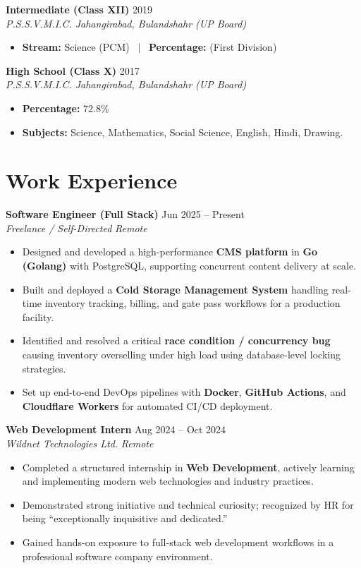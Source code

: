 \documentclass[a4paper,10pt]{article}
\newcommand{\entry}[4]{
  \noindent\textbf{#1} \hfill #2 \\
  \textit{#3} \hfill \textit{#4}
}
\begin{document}
\vspace{5pt}

\entry{Intermediate (Class XII)}{2019}
{P.S.S.V.M.I.C. Jahangirabad, Bulandshahr (UP Board)}{}
\begin{itemize}[noitemsep,topsep=0pt,leftmargin=15pt]
    \item \textbf{Stream:} Science (PCM) \ $|$ \ \textbf{Percentage:}  (First Division)
\end{itemize}

\vspace{5pt}

\entry{High School (Class X)}{2017}
{P.S.S.V.M.I.C. Jahangirabad, Bulandshahr (UP Board)}{}
\begin{itemize}[noitemsep,topsep=0pt,leftmargin=15pt]
    \item \textbf{Percentage:} 72.8\%
    \item \textbf{Subjects:} Science, Mathematics, Social Science, English, Hindi, Drawing.
\end{itemize}

\section{Work Experience}

\entry{Software Engineer (Full Stack)}{Jun 2025 -- Present}
{Freelance / Self-Directed}{Remote}
\begin{itemize}[noitemsep,topsep=0pt,leftmargin=15pt]
    \item Designed and developed a high-performance \textbf{CMS platform} in \textbf{Go (Golang)} with PostgreSQL, supporting concurrent content delivery at scale.
    \item Built and deployed a \textbf{Cold Storage Management System} handling real-time inventory tracking, billing, and gate pass workflows for a production facility.
    \item Identified and resolved a critical \textbf{race condition / concurrency bug} causing inventory overselling under high load using database-level locking strategies.
    \item Set up end-to-end DevOps pipelines with \textbf{Docker}, \textbf{GitHub Actions}, and \textbf{Cloudflare Workers} for automated CI/CD deployment.
\end{itemize}

\vspace{5pt}

\entry{Web Development Intern}{Aug 2024 -- Oct 2024}
{Wildnet Technologies Ltd.}{Remote}
\begin{itemize}[noitemsep,topsep=0pt,leftmargin=15pt]
    \item Completed a structured internship in \textbf{Web Development}, actively learning and implementing modern web technologies and industry practices.
    \item Demonstrated strong initiative and technical curiosity; recognized by HR for being ``exceptionally inquisitive and dedicated.''
    \item Gained hands-on exposure to full-stack web development workflows in a professional software company environment.
\end{itemize}
\end{document}

